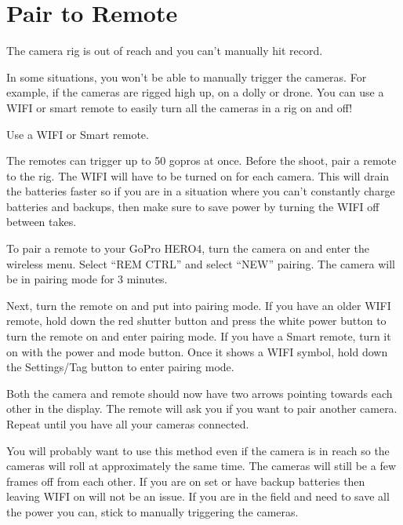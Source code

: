\chapter{Pair to Remote}
\pagecolor{white}
\label{chap:09}
\begin{fullwidth}

\problem

{\large The camera rig is out of reach and you can’t manually hit record. \par}

In some situations, you won’t be able to manually trigger the cameras. For example, if the cameras are rigged high up, on a dolly or drone. You can use a WIFI or smart remote to easily turn all the cameras in a rig on and off!


\solution

{\large Use a WIFI or Smart remote. \par}

The remotes can trigger up to 50 gopros at once. Before the shoot, pair a remote to the rig. The WIFI will have to be turned on for each camera. This will drain the batteries faster so if you are in a situation where you can’t constantly charge batteries and backups, then make sure to save power by turning the WIFI off between takes. 

To pair a remote to your GoPro HERO4, turn the camera on and enter the wireless menu. Select “REM CTRL” and select “NEW” pairing. The camera will be in pairing mode for 3 minutes.


Next, turn the remote on and put into pairing mode. If you have an older WIFI remote, hold down the red shutter button and press the white power button to turn the remote on and enter pairing mode. If you have a Smart remote, turn it on with the power and mode button. Once it shows a WIFI symbol, hold down the Settings/Tag button to enter pairing mode. 


Both the camera and remote should now have two arrows pointing towards each other in the display. The remote will ask you if you want to pair another camera. Repeat until you have all your cameras connected.


You will probably want to use this method even if the camera is in reach so the cameras will roll at approximately the same time. The cameras will still be a few frames off from each other. If you are on set or have backup batteries then leaving WIFI on will not be an issue. If you are in the field and need to save all the power you can, stick to manually triggering the cameras. 



\clearpage
\end{fullwidth}
